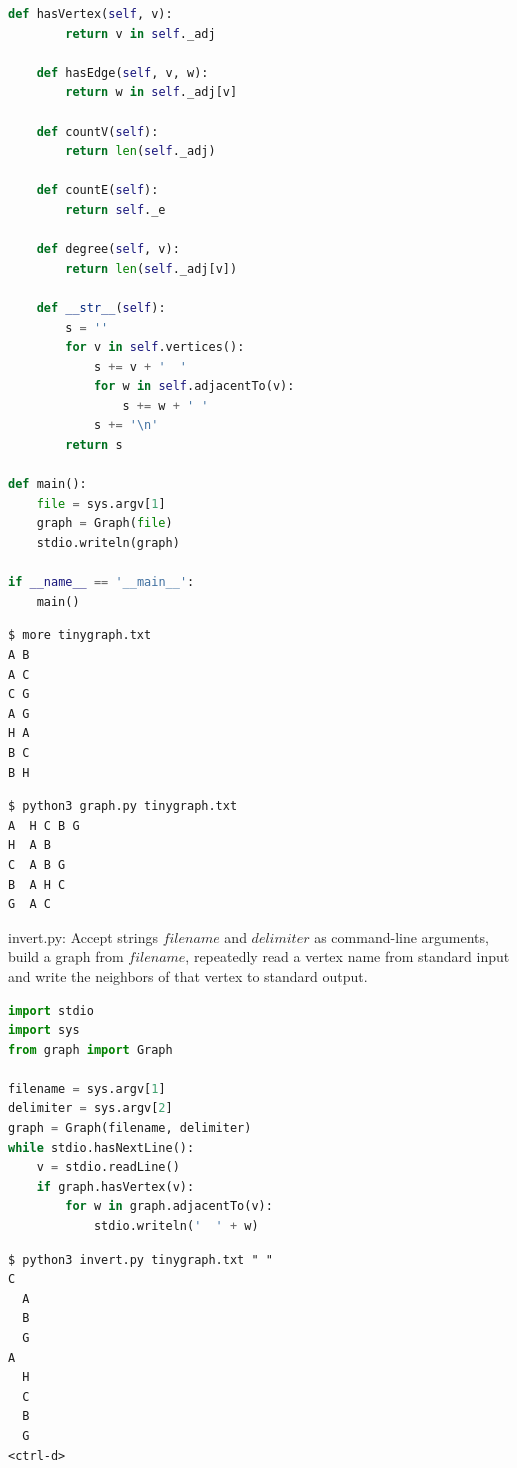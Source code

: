 \documentclass[8pt,a4paper,compress]{beamer}
\begin{document}
\begin{frame}[fragile]
\pause

\begin{lstlisting}[language=python,style=focusin]
    def hasVertex(self, v):
        return v in self._adj

    def hasEdge(self, v, w):
        return w in self._adj[v]
    
    def countV(self):
        return len(self._adj)
    
    def countE(self):
        return self._e
    
    def degree(self, v):
        return len(self._adj[v])

    def __str__(self):
        s = ''
        for v in self.vertices():
            s += v + '  '
            for w in self.adjacentTo(v):
                s += w + ' '
            s += '\n'
        return s

def main():
    file = sys.argv[1]
    graph = Graph(file)
    stdio.writeln(graph)

if __name__ == '__main__':
    main()
\end{lstlisting}
\end{frame}

\begin{frame}[fragile]
\pause

\begin{lstlisting}[language={},style=focusin]
$ more tinygraph.txt
A B
A C
C G
A G
H A
B C
B H
\end{lstlisting}

\pause

\begin{lstlisting}[language={},style=focusin]
$ python3 graph.py tinygraph.txt 
A  H C B G 
H  A B 
C  A B G 
B  A H C 
G  A C 

\end{lstlisting}
\end{frame}

\begin{frame}[fragile]
\pause

\begin{framed}
\tiny invert.py: Accept strings $filename$ and $delimiter$ as command-line arguments, build a graph from $filename$, repeatedly read a vertex name from standard input and write the neighbors of that vertex to standard output.
\end{framed}

\begin{lstlisting}[language=python,style=focusin]
import stdio
import sys
from graph import Graph

filename = sys.argv[1]
delimiter = sys.argv[2]
graph = Graph(filename, delimiter)
while stdio.hasNextLine():
    v = stdio.readLine()
    if graph.hasVertex(v):
        for w in graph.adjacentTo(v):
            stdio.writeln('  ' + w)
\end{lstlisting}

\pause

\begin{lstlisting}[language={},style=focusin]
$ python3 invert.py tinygraph.txt " "
C
  A
  B
  G
A
  H
  C
  B
  G
<ctrl-d>
\end{lstlisting}
\end{frame}
\end{document}
